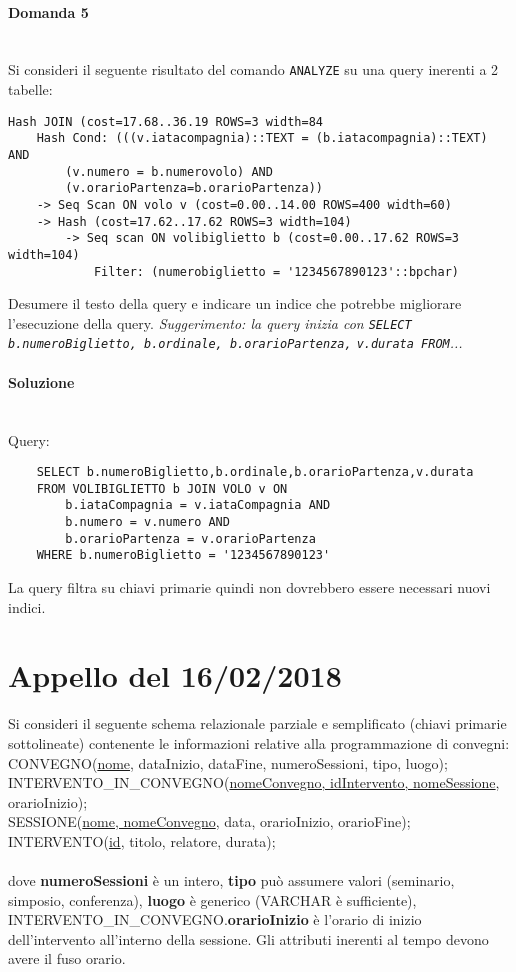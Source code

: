 \documentclass[a4paper, 10pt, titlepage]{article}
\begin{document}
\paragraph{Domanda 5}\dotfill
\\Si consideri il seguente risultato del comando \lstinline|ANALYZE| su una query inerenti a 2 tabelle:
\begin{small}
\begin{lstlisting}
Hash JOIN (cost=17.68..36.19 ROWS=3 width=84
	Hash Cond: (((v.iatacompagnia)::TEXT = (b.iatacompagnia)::TEXT) AND 
		(v.numero = b.numerovolo) AND
		(v.orarioPartenza=b.orarioPartenza))
	-> Seq Scan ON volo v (cost=0.00..14.00 ROWS=400 width=60)
	-> Hash (cost=17.62..17.62 ROWS=3 width=104)
		-> Seq scan ON volibiglietto b (cost=0.00..17.62 ROWS=3 width=104)
			Filter: (numerobiglietto = '1234567890123'::bpchar)
\end{lstlisting}
\end{small}
Desumere il testo della query e indicare un indice che potrebbe migliorare l'esecuzione della query. \textit{Suggerimento: la query inizia con {\small \lstinline|SELECT b.numeroBiglietto, b.ordinale, b.orarioPartenza,| \lstinline|v.durata FROM|...}}
\paragraph{Soluzione}\dotfill
\\Query:
\begin{lstlisting}
	SELECT b.numeroBiglietto,b.ordinale,b.orarioPartenza,v.durata
	FROM VOLIBIGLIETTO b JOIN VOLO v ON 
		b.iataCompagnia = v.iataCompagnia AND
		b.numero = v.numero AND
		b.orarioPartenza = v.orarioPartenza
	WHERE b.numeroBiglietto = '1234567890123'
\end{lstlisting}
La query filtra su chiavi primarie quindi non dovrebbero essere necessari nuovi indici. 

\newpage

\section{Appello del 16/02/2018}
Si consideri il seguente schema relazionale parziale e semplificato (chiavi primarie sottolineate) contenente le informazioni relative alla programmazione di convegni: \medskip \\
CONVEGNO(\underline{nome}, dataInizio, dataFine, numeroSessioni, tipo, luogo);\\
INTERVENTO\_IN\_CONVEGNO(\underline{nomeConvegno, idIntervento, nomeSessione}, orarioInizio);\\
SESSIONE(\underline{nome, nomeConvegno}, data, orarioInizio, orarioFine);\\
INTERVENTO(\underline{id}, titolo, relatore, durata);\\
\\
dove \textbf{numeroSessioni} è un intero, \textbf{tipo} può assumere valori (seminario, simposio, conferenza), \textbf{luogo} è generico (VARCHAR è sufficiente), INTERVENTO\_IN\_CONVEGNO.\textbf{orarioInizio} è l'orario di inizio dell'intervento all'interno della sessione. Gli attributi inerenti al tempo devono avere il fuso orario.
\end{document}
